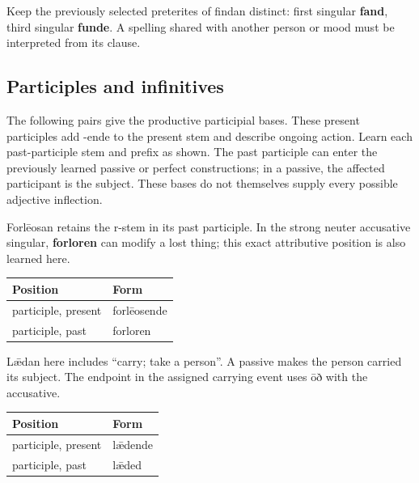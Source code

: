 Keep the previously selected preterites of findan distinct: first singular \textbf{fand}, third singular \textbf{funde}. A spelling shared with another person or mood must be interpreted from its clause.

\subsection*{Participles and infinitives}

The following pairs give the productive participial bases. These present participles add -ende to the present stem and describe ongoing action. Learn each past-participle stem and prefix as shown. The past participle can enter the previously learned passive or perfect constructions; in a passive, the affected participant is the subject. These bases do not themselves supply every possible adjective inflection.

Forlēosan retains the r-stem in its past participle. In the strong neuter accusative singular, \textbf{forloren} can modify a lost thing; this exact attributive position is also learned here.

\par\begingroup
\fontsize{10.5}{13.2}\selectfont
\setlength{\LTleft}{0pt}\setlength{\LTright}{\fill}
\noindent
\begin{tabular}{@{}>{\raggedright\arraybackslash}p{69.12mm}>{\raggedright\arraybackslash}p{52.07mm}@{}}
\toprule
\textbf{Position} & \textbf{Form} \\
\midrule
participle, present & forlēosende \\
participle, past & forloren \\
\bottomrule
\end{tabular}
\par\endgroup

Lǣdan here includes “carry; take a person”. A passive makes the person carried its subject. The endpoint in the assigned carrying event uses ōð with the accusative.

\par\begingroup
\fontsize{10.5}{13.2}\selectfont
\setlength{\LTleft}{0pt}\setlength{\LTright}{\fill}
\noindent
\begin{tabular}{@{}>{\raggedright\arraybackslash}p{71.92mm}>{\raggedright\arraybackslash}p{49.26mm}@{}}
\toprule
\textbf{Position} & \textbf{Form} \\
\midrule
participle, present & lǣdende \\
participle, past & lǣded \\
\bottomrule
\end{tabular}
\par\endgroup

